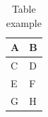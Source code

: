 

\begin{table}[ht]
    \centering
    \begin{tabular}{|l|l|}
    \hline
    \textbf{A} & \textbf{B} \\ \hline
    C          & D          \\ \hline
    E          & F          \\ \hline
    G          & H          \\ \hline
    \end{tabular}
    \caption{Table example \label{tab:table-name}}
\end{table}